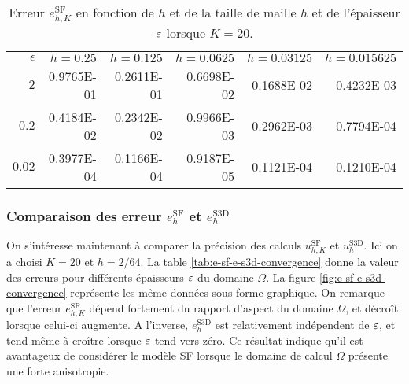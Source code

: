 \begin{table}[t]
  \caption{Erreur $e_{h,K}^\mathrm{SF}$ en fonction de $h$ et de
    la taille de maille $h$ et de l'épaisseur $\varepsilon$ lorsque $K
    = 20$.}
  \label{tab:n-h-convergence}
  \begin{center}
    \begin{tabular}{@{}rrrrrr@{}}
      \toprule
      $\epsilon$ & $h = 0.25$ & $h = 0.125$ & $h = 0.0625$ & $h = 0.03125$ & $h = 0.015625$ \\
      \cmidrule{1-6}
      $2$      & \num{0.9765E-01} & \num{0.2611E-01} & \num{0.6698E-02} & \num{0.1688E-02} & \num{0.4232E-03} \\
      $0.2$    & \num{0.4184E-02} & \num{0.2342E-02} & \num{0.9966E-03} & \num{0.2962E-03} & \num{0.7794E-04} \\
      $0.02$   & \num{0.3977E-04} & \num{0.1166E-04} & \num{0.9187E-05} & \num{0.1121E-04} & \num{0.1210E-04} \\
      \bottomrule
    \end{tabular}
  \end{center}
\end{table}

\subsubsection{Comparaison des erreur $e_h^{\mathrm{SF}}$ et
  $e_h^{\mathrm{S3D}}$} On s'intéresse maintenant à comparer la
précision des calculs $u_{h,K}^\mathrm{SF}$ et
$u_h^{\mathrm{S3D}}$. Ici on a choisi $K = 20$ et $h = 2/64$. La table
\ref{tab:e-sf-e-s3d-convergence} donne la valeur des erreurs pour
différents épaisseurs $\varepsilon$ du domaine $\Omega$. La figure
\ref{fig:e-sf-e-s3d-convergence} représente les même données sous
forme graphique. On remarque que l'erreur $e_{h,K}^\mathrm{SF}$
dépend fortement du rapport d'aspect du domaine $\Omega$, et
décroît lorsque celui-ci augmente. A l'inverse, $e_h^\mathrm{S3D}$ est
relativement indépendent de $\varepsilon$, et tend même à croître
lorsque $\varepsilon$ tend vers zéro. Ce résultat indique qu'il est
avantageux de considérer le modèle SF lorsque le domaine de calcul
$\Omega$ présente une forte anisotropie.

